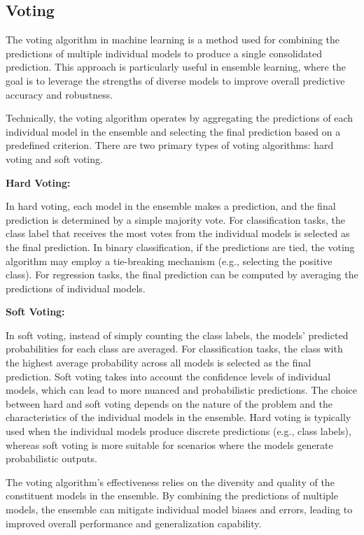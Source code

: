 \documentclass[preprint,aps,nofootinbib,a4paper,superscriptaddress,longbibliography,amsfonts,amssymb,amsmath,titlepage]{revtex4-2}
\begin{document}
\subsection{Voting}

The voting algorithm in machine learning is a method used for combining the predictions of multiple individual models to produce a single consolidated prediction. This approach is particularly useful in ensemble learning, where the goal is to leverage the strengths of diverse models to improve overall predictive accuracy and robustness.

Technically, the voting algorithm operates by aggregating the predictions of each individual model in the ensemble and selecting the final prediction based on a predefined criterion. There are two primary types of voting algorithms: hard voting and soft voting.

\textbf{Hard Voting:}

In hard voting, each model in the ensemble makes a prediction, and the final prediction is determined by a simple majority vote.
For classification tasks, the class label that receives the most votes from the individual models is selected as the final prediction.
In binary classification, if the predictions are tied, the voting algorithm may employ a tie-breaking mechanism (e.g., selecting the positive class).
For regression tasks, the final prediction can be computed by averaging the predictions of individual models.

\textbf{Soft Voting:}

In soft voting, instead of simply counting the class labels, the models' predicted probabilities for each class are averaged.
For classification tasks, the class with the highest average probability across all models is selected as the final prediction.
Soft voting takes into account the confidence levels of individual models, which can lead to more nuanced and probabilistic predictions.
The choice between hard and soft voting depends on the nature of the problem and the characteristics of the individual models in the ensemble. Hard voting is typically used when the individual models produce discrete predictions (e.g., class labels), whereas soft voting is more suitable for scenarios where the models generate probabilistic outputs.

The voting algorithm's effectiveness relies on the diversity and quality of the constituent models in the ensemble. By combining the predictions of multiple models, the ensemble can mitigate individual model biases and errors, leading to improved overall performance and generalization capability.
\end{document}
